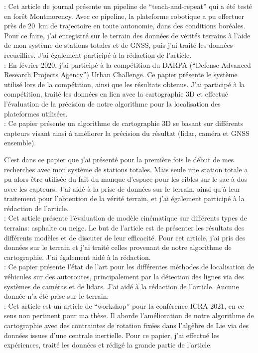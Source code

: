 \textbf{}:
Cet article de journal présente un pipeline de ``teach-and-repeat'' qui a été testé en forêt Montmorency. 
Avec ce pipeline, la plateforme robotique a pu effectuer près de \SI{20}{km} de trajectoire en toute autonomie, dans des conditions boréales. 
Pour ce faire, j'ai enregistré sur le terrain des données de vérités terrains à l'aide de mon système de stations totales et de \ac{GNSS}, puis j'ai traité les données recueillies. 
J'ai également participé à la rédaction de l'article.
\\

\textbf{}:
En février 2020, j'ai participé à la compétition du DARPA (``Defense Advanced Research Projects Agency'') Urban Challenge. 
Ce papier présente le système utilisé lors de la compétition, ainsi que les résultats obtenus. 
J'ai participé à la compétition, traité les données en lien avec la cartographie 3D et effectué l'évaluation de la précision de notre algorithme pour la localisation des plateformes utilisées.
\\

\textbf{}: 
Ce papier présente un algorithme de cartographie 3D se basant sur différents capteurs visant ainsi à améliorer la précision du résultat (lidar, caméra et \ac{GNSS} ensemble).

C'est dans ce papier que j'ai présenté pour la première fois le début de mes recherches avec mon système de stations totales. 
Mais seule une station totale a pu alors être utilisée du fait du manque d'espace pour les cibles sur le sac à dos avec les capteurs.
J'ai aidé à la prise de données sur le terrain, ainsi qu'à leur traitement pour l'obtention de la vérité terrain, et j'ai également participé à la rédaction de l'article.
\\

\textbf{}:
Cet article présente l'évaluation de modèle cinématique sur différents types de terrains: asphalte ou neige. 
Le but de l'article est de présenter les résultats des différents modèles et de discuter de leur efficacité. 
Pour cet article, j'ai pris des données sur le terrain et j'ai traité celles provenant de notre algorithme de cartographie. 
J'ai également aidé à la rédaction.
\\

\textbf{}:
Ce papier présente l'état de l'art pour les différentes méthodes de localisation de véhicules sur des autoroutes, principalement par la détection des lignes via des systèmes de caméras et de lidars.
J'ai aidé à la rédaction de l'article. Aucune donnée n'a été prise sur le terrain.
\\

\textbf{}:
Cet article est un article de ``workshop'' pour la conférence ICRA 2021, en ce sens non pertinent pour ma thèse.
Il aborde l'amélioration de notre algorithme de cartographie avec des contraintes de rotation fixées dans l'algèbre de Lie via des données issues d'une centrale inertielle.
Pour ce papier, j'ai effectué les expériences, traité les données et rédigé la grande partie de l'article.